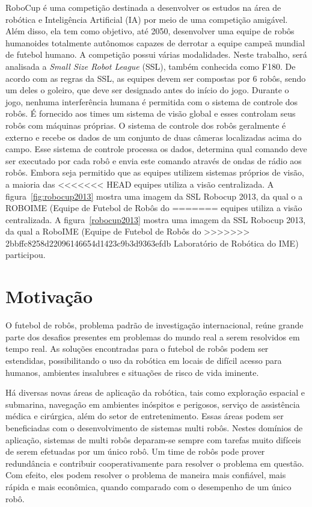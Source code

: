 RoboCup é uma competição destinada a desenvolver os estudos na área de robótica e
Inteligência Artificial (IA) por meio de uma competição amigável. Além disso, ela tem
como objetivo, até 2050, desenvolver uma equipe de robôs humanoides totalmente
autônomos capazes de derrotar a equipe campeã mundial de futebol humano. A competição
possui várias modalidades. Neste trabalho, será analisada a \textit{Small Size Robot League} (SSL),
também conhecida como F180. De acordo com as regras da SSL, as equipes devem ser
compostas por 6 robôs, sendo um deles o goleiro, que deve ser
designado antes do início do jogo. Durante o jogo, nenhuma interferência humana é
permitida com o sistema de controle dos robôs. É fornecido aos times um sistema de
visão global e esses controlam seus robôs com máquinas próprias. O sistema de controle
dos robôs geralmente é externo e recebe os dados de um conjunto de duas câmeras
localizadas acima do campo. Esse sistema de controle processa os dados, determina qual comando deve ser executado por
cada robô e envia este comando através de ondas de rádio aos robôs. Embora seja
permitido que as equipes utilizem sistemas próprios de visão, a maioria das
<<<<<<< HEAD
equipes utiliza a visão centralizada. A figura~\ref{fig:robocup2013} mostra uma
imagem da SSL Robocup 2013, da qual o a ROBOIME (Equipe de Futebol de Robôs do
=======
equipes utiliza a visão centralizada. A figura~\ref{robocup2013} mostra uma
imagem da SSL Robocup 2013, da qual a RoboIME (Equipe de Futebol de Robôs do
>>>>>>> 2bbffc8258d22096146654d1423c9b3d9363efdb
Laboratório de Robótica do IME) participou.

\section{Motivação}

O futebol de robôs, problema padrão de investigação internacional, reúne grande parte
dos desafios presentes em problemas do mundo real a serem resolvidos em tempo real.
As soluções encontradas para o futebol de robôs podem ser estendidas, possibilitando
o uso da robótica em locais de difícil acesso para humanos, ambientes insalubres e
situações de risco de vida iminente.

Há diversas novas áreas de aplicação da robótica, tais como exploração espacial e submarina,
navegação em ambientes inóspitos e perigosos, serviço de assistência médica
e cirúrgica, além do setor de entretenimento. Essas áreas podem ser beneficiadas com o
desenvolvimento de sistemas
multi robôs. Nestes domínios de aplicação, sistemas de multi robôs deparam-se sempre
com tarefas muito difíceis de serem efetuadas por um único robô. Um time de robôs pode
prover redundância e contribuir cooperativamente para resolver o problema em questão.
Com efeito, eles podem resolver o problema de maneira mais confiável, mais rápida e
mais econômica, quando comparado com o desempenho de um único robô.

